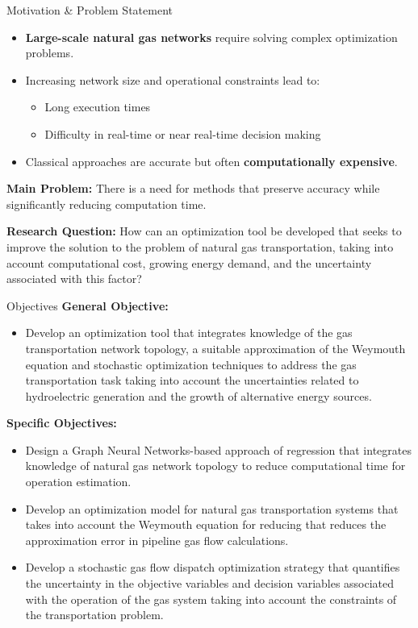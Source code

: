 \documentclass[hyperref={colorlinks,citecolor=blue,linkcolor=blue,urlcolor=blue}]{beamer}
\begin{document}
\begin{frame}{Motivation \& Problem Statement}
\footnotesize
\justifying
\begin{itemize}
    \item \textbf{Large-scale natural gas networks} require solving complex optimization problems.
    \item Increasing network size and operational constraints lead to:
    \begin{itemize}
        \item Long execution times
        \item Difficulty in real-time or near real-time decision making
    \end{itemize}
    \item Classical approaches are accurate but often \textbf{computationally expensive}.
\end{itemize}

\vspace{0.5cm}
\textbf{Main Problem:} There is a need for methods that preserve accuracy while significantly reducing computation time.

\vspace{0.5cm}
\textbf{Research Question:} How can an optimization tool be developed that seeks to improve the solution to the problem of natural gas transportation, taking into account computational cost, growing energy demand, and the uncertainty associated with this factor?
\end{frame}


\begin{frame}{Objectives}
\footnotesize
\textbf{General Objective:}
\begin{itemize}
    \item Develop an optimization tool that integrates knowledge of the gas transportation network topology, a suitable approximation of the Weymouth equation and stochastic optimization techniques to address the gas transportation task taking into account the uncertainties related to hydroelectric generation and the growth of alternative energy sources.
\end{itemize}
\textbf{Specific Objectives:}
\begin{itemize}
    \item Design a Graph Neural Networks-based approach of regression that integrates knowledge of natural gas network topology to reduce computational time for operation estimation.    
    \item Develop an optimization model for natural gas transportation systems that takes into account the Weymouth equation for reducing that reduces the approximation error in pipeline gas flow calculations.
    \item Develop a stochastic gas flow dispatch optimization strategy that quantifies the uncertainty in the objective variables and decision variables associated with the operation of the gas system taking into account the constraints of the transportation problem.
\end{itemize}
\end{frame}
\end{document}
